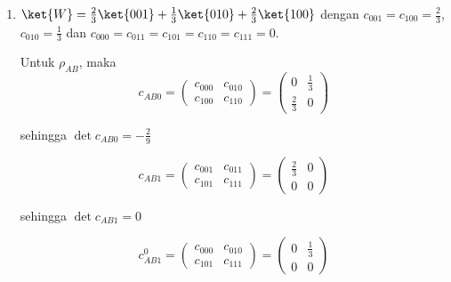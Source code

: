 \begin{enumerate}
	sehingga $\det c_{1BC}^0 = 0$
	
	\begin{equation}
		c_{0BC}^1=
		\begin{pmatrix}
			c_{100} & c_{101} \\
			c_{010} & c_{011}
		\end{pmatrix}=
		\begin{pmatrix}
			\frac{1}{3} & 0 \\
			\frac{2}{3} & 0
		\end{pmatrix}
	\end{equation}
	
	sehingga $\det c_{0BC}^1 = 0$.
	
	Maka
	\begin{equation}
		\mathrm{Tr}\,\rho_{BC}\tilde{\rho}_{BC}=4|\det c_{0BC}|^2=4(-\frac{4}{9})^2=\frac{64}{81}
	\end{equation}
	
	\item { $\ket{W}=\frac{2}{3}\ket{001}+\frac{1}{3}\ket{010}+\frac{2}{3}\ket{100}$}
	dengan $c_{001}=c_{100}=\frac{2}{3}$, $c_{010}=\frac{1}{3}$ dan $c_{000}=c_{011}=c_{101}=c_{110}=c_{111}=0$.
	
	Untuk $\rho_{AB}$, maka
	\begin{equation}
		c_{AB0}=
		\begin{pmatrix}
			c_{000} & c_{010} \\
			c_{100} & c_{110}
		\end{pmatrix}=
		\begin{pmatrix}
			0 & \frac{1}{3} \\
			\frac{2}{3} & 0
		\end{pmatrix}
	\end{equation}
	
	sehingga $\det c_{AB0} = -\frac{2}{9}$
	
	\begin{equation}
		c_{AB1}=
		\begin{pmatrix}
			c_{001} & c_{011} \\
			c_{101} & c_{111}
		\end{pmatrix}=
		\begin{pmatrix}
			\frac{2}{3} & 0 \\
			0 & 0
		\end{pmatrix}
	\end{equation}
	
	sehingga $\det c_{AB1} = 0$
	
	\begin{equation}
		c_{AB1}^0=
		\begin{pmatrix}
			c_{000} & c_{010} \\
			c_{101} & c_{111}
		\end{pmatrix}=
		\begin{pmatrix}
			0 & \frac{1}{3} \\
			0 & 0
		\end{pmatrix}
	\end{equation}
	

\end{enumerate}
